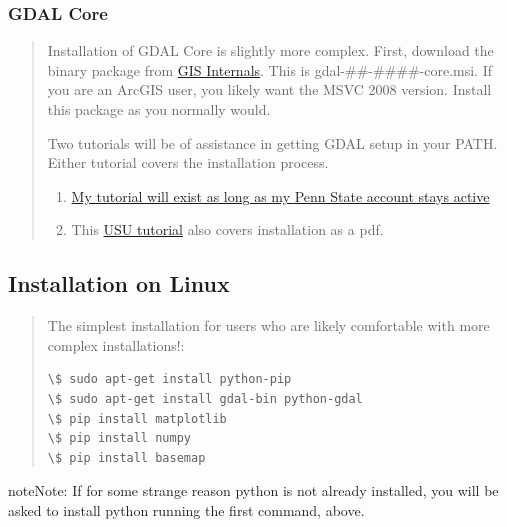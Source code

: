 \documentclass[letterpaper,10pt,english]{sphinxmanual}
\begin{document}
\subsubsection{GDAL Core}
\label{Installation:gdal-core}\begin{quote}

Installation of GDAL Core is slightly more complex.  First, download the binary package from \href{http://www.gisinternals.com/sdk/PackageList.aspx?file=release-1600-gdal-1-9-2-mapserver-6-2-0.zip}{GIS Internals}.  This is gdal-\#\#-\#\#\#\#-core.msi.  If you are an ArcGIS user, you likely want the MSVC 2008 version.  Install this package as you normally would.

Two tutorials will be of assistance in getting GDAL setup in your PATH.  Either tutorial covers the installation process.
\begin{enumerate}
\item {} 
\href{http://php.scripts.psu.edu/jzl5325/wordpress/?p=60}{My tutorial will exist as long as my Penn State account stays active}

\item {} 
This \href{http://www.gis.usu.edu/~chrisg/python/2009/docs/gdal\_win.pdf}{USU tutorial} also covers installation as a pdf.

\end{enumerate}
\end{quote}


\subsection{Installation on Linux}
\label{Installation:installation-on-linux}\begin{quote}

The simplest installation for users who are likely comfortable with more complex installations!:

\begin{Verbatim}[commandchars=\\\{\}]
\$ sudo apt-get install python-pip
\$ sudo apt-get install gdal-bin python-gdal
\$ pip install matplotlib
\$ pip install numpy
\$ pip install basemap
\end{Verbatim}
\end{quote}

\begin{notice}{note}{Note:}
If for some strange reason python is not already installed, you will be asked to install python running the first command, above.
\end{notice}
\end{document}
